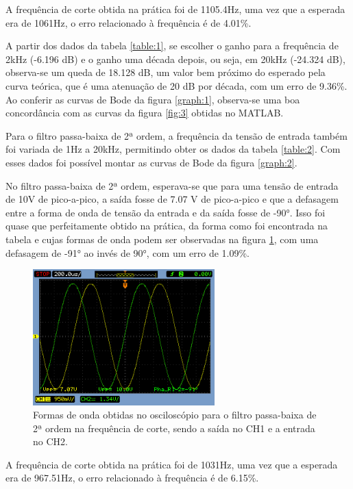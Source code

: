 A frequência de corte obtida na prática foi de 1105.4Hz, uma vez que a esperada era de 1061Hz, o erro relacionado à frequência é de 4.01\%.

A partir dos dados da tabela \ref{table:1}, se escolher o ganho para a frequência de 2kHz (-6.196 dB) e o ganho uma década depois, ou seja, em 20kHz (-24.324 dB), observa-se um queda de 18.128 dB, um valor bem próximo do esperado pela curva teórica, que é uma atenuação de 20 dB por década, com um erro de 9.36\%. Ao conferir as curvas de Bode da figura \ref{graph:1}, observa-se uma boa concordância com as curvas da figura \ref{fig:3} obtidas no MATLAB.

Para o  filtro passa-baixa de 2ª ordem, a frequência da tensão de entrada também foi variada de 1Hz a 20kHz, permitindo obter os dados da tabela \ref{table:2}. Com esses dados foi possível montar as curvas de Bode da figura \ref{graph:2}. 



No filtro passa-baixa de 2ª ordem, esperava-se que para uma tensão de entrada de 10V de pico-a-pico, a saída fosse de 7.07 V de pico-a-pico e que a defasagem entre a forma de onda de tensão da entrada e da saída fosse de -90°. Isso foi quase que perfeitamente obtido na prática, da forma como foi encontrada na tabela e cujas formas de onda podem ser observadas na figura \ref{fo2}, com uma defasagem de -91° ao invés de 90°, com um erro de 1.09\%.

\begin{figure}[H] 
\centering
\includegraphics[width=7cm]{images/f0_2.png}
\caption{Formas de onda obtidas no osciloscópio para o filtro passa-baixa de 2ª ordem na frequência de corte, sendo a saída no CH1 e a entrada no CH2.}
\label{fo2} 
\end{figure}

A frequência de corte obtida na prática foi de 1031Hz, uma vez que a esperada era de 967.51Hz, o erro relacionado à frequência é de 6.15\%.

